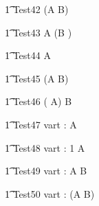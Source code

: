 \begin{circusaction}
   \t1 Test42 \circdef  (A \circseq B) \circseq {} \\
\end{circusaction}

\begin{circusaction}
   \t1 Test43 \circdef  A \circseq (B \circseq {}) \\
\end{circusaction}

\begin{circusaction}
   \t1 Test44 \circdef  {} \circseq A \\
\end{circusaction}

\begin{circusaction}
   \t1 Test45 \circdef  {} \circseq (A \circseq B) \\
\end{circusaction}

\begin{circusaction}
   \t1 Test46 \circdef  ( \circseq A) \circseq B \\
\end{circusaction}


\begin{circusaction}
  \t1 Test47 \circdef \circwait vart : \nat  \circspot A \\
\end{circusaction}

\begin{circusaction}
  \t1 Test48 \circdef \circwait vart : 1   \circspot  A \\
\end{circusaction}


\begin{circusaction}
  \t1 Test49 \circdef \circwait vart : \nat  \circspot  A \circseq   B \\
\end{circusaction}

\begin{circusaction}
  \t1 Test50 \circdef \circwait vart : \nat  \circspot  (A \circseq  B) \\
\end{circusaction}


